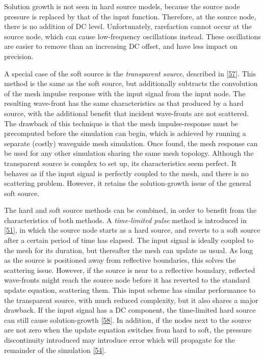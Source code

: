 \documentclass[]{scrreprt}
\begin{document}
Solution growth is not seen in hard source models, because the source
node pressure is replaced by that of the input function. Therefore, at
the source node, there is no addition of DC level. Unfortunately,
rarefaction cannot occur at the source node, which can cause
low-frequency oscillations instead. These oscillations are easier to
remove than an increasing DC offset, and have less impact on precision.

A special case of the soft source is the \emph{transparent source},
described in
{[}\protect\hyperlink{ref-schneiderux5fimplementationux5f1998}{57}{]}.
This method is the same as the soft source, but additionally subtracts
the convolution of the mesh impulse response with the input signal from
the input node. The resulting wave-front has the same characteristics as
that produced by a hard source, with the additional benefit that
incident wave-fronts are not scattered. The drawback of this technique
is that the mesh impulse-response must be precomputed before the
simulation can begin, which is achieved by running a separate (costly)
waveguide mesh simulation. Once found, the mesh response can be used for
any other simulation sharing the same mesh topology. Although the
transparent source is complex to set up, its characteristics seem
perfect. It behaves as if the input signal is perfectly coupled to the
mesh, and there is no scattering problem. However, it retains the
solution-growth issue of the general soft source.

The hard and soft source methods can be combined, in order to benefit
from the characteristics of both methods. A \emph{time-limited pulse}
method is introduced in
{[}\protect\hyperlink{ref-jeongux5fsourceux5f2012}{51}{]}, in which the
source node starts as a hard source, and reverts to a soft source after
a certain period of time has elapsed. The input signal is ideally
coupled to the mesh for its duration, but thereafter the mesh can update
as usual. As long as the source is positioned away from reflective
boundaries, this solves the scattering issue. However, if the source is
near to a reflective boundary, reflected wave-fronts might reach the
source node before it has reverted to the standard update equation,
scattering them. This input scheme has similar performance to the
transparent source, with much reduced complexity, but it also shares a
major drawback. If the input signal has a DC component, the time-limited
hard source can still cause solution-growth
{[}\protect\hyperlink{ref-sheafferux5fphysically-constrainedux5f2012}{58}{]}.
In addition, if the nodes next to the source are not zero when the
update equation switches from hard to soft, the pressure discontinuity
introduced may introduce error which will propagate for the remainder of
the simulation
{[}\protect\hyperlink{ref-sheafferux5fphysicalux5f2014}{54}{]}.
\end{document}
